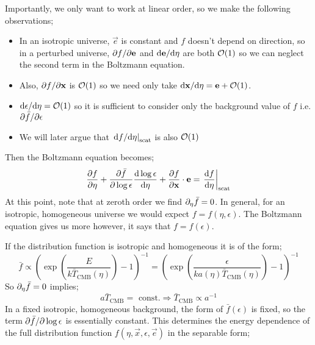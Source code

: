 Importantly, we only want to work at linear order, so we make the following observations;
\begin{itemize}
\item In an isotropic universe, $\vec e$ is constant and $f$ doesn't depend on direction, so in a perturbed universe, $\partial f/\partial \mathbf{e}$ and $\text{d} \mathbf{e} / \text{d} \eta$ are both $\mathcal{O}(1)$ so we can neglect the second term in the Boltzmann equation.
\item Also, $\partial f / \partial \mathbf{x}$ is $\mathcal{O}(1)$ so we need only take $\text{d} \mathbf{x} / \text{d} \eta = \mathbf{e} + \mathcal{O}(1)$.
\item $\text{d} \epsilon / \text{d} \eta = \mathcal{O}(1)$ so it is sufficient to consider only the background value of $f$ i.e. $\partial \bar{f} / \partial \epsilon$
\item We will later argue that $\left.\ud f / \ud \eta \right|_{\text{scat}}$ is also $\mathcal{O}(1)$
\end{itemize}
\begin{definitionbox}
Then the Boltzmann equation becomes;
\begin{equation}
\frac{\del f}{\del \eta} + \frac{\del \bar{f}}{\del \log \epsilon}\frac{\ud \log \epsilon}{\ud \eta} + \frac{\del f}{\del \vec{x}} \cdot \vec{e} = \left.\frac{\ud f}{\ud \eta}\right|_{\text{scat}}
\end{equation}
At this point, note that at zeroth order we find $\partial_\eta \bar{f} = 0$. In general, for an isotropic, homogeneous universe we would expect $f = f(\eta, \epsilon)$. The Boltzmann equation gives us more however, it says that $f = f(\epsilon)$.
\end{definitionbox}
If the distribution function is isotropic and homogeneous it is of the form;
\begin{equation}
\bar{f} \propto \left(\exp\left(\frac{E}{k\bar{T}_{\text{CMB}}(\eta)}\right) - 1\right)^{-1} = \left(\exp\left(\frac{\epsilon}{k a(\eta)\bar{T}_{\text{CMB}}(\eta)}\right) - 1\right)^{-1}
\end{equation}
So $\partial_\eta \bar{f} = 0$ implies;
\begin{equation}
a\bar{T}_{\text{CMB}} = \,\,\text{const.} \Rightarrow \bar{T}_{\text{CMB}} \propto a^{-1}
\end{equation}
In a fixed isotropic, homogeneous background, the form of $\bar{f}(\epsilon)$ is fixed, so the term $\partial \bar{f} / \partial \log \epsilon$ is essentially constant. This determines the energy dependence of the full distribution function $f(\eta, \vec x, \epsilon, \vec e)$ in the separable form;
